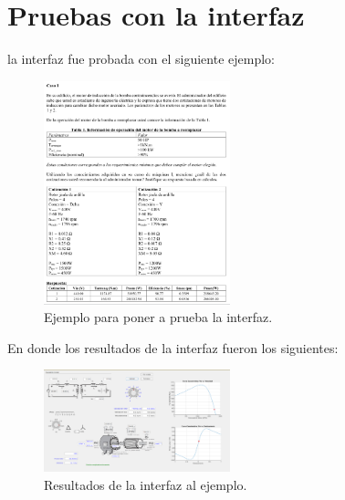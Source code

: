 \section{Pruebas con la interfaz}
la interfaz fue probada con el siguiente ejemplo:
\begin{figure}[ht!]
    \centering
    \includegraphics[width=0.48\textwidth]{imginterfaz/Ejemplo.png}
    \caption{Ejemplo para poner a prueba la interfaz.}
    \label{fig:Ejemplo}
\end{figure}


En donde los resultados de la interfaz fueron los siguientes:
\begin{figure}[ht!]
    \centering
    \includegraphics[width=0.48\textwidth]{imginterfaz/resultados (2).png}
    \caption{Resultados de la interfaz al ejemplo.}
    \label{fig:resultado}
\end{figure}